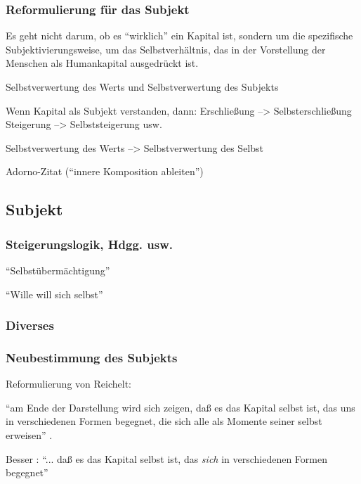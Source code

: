 \documentclass[12pt,
               DIV13,
               paper=a4,
               twoside=false,
               onehalfspacing,
               bibliography=totoc,
               toc=graduated,
               draft,
               ]{scrartcl}
\newcommand{\pc}[2]{\parencite[#1]{#2}}
\newcommand{\worries}[1]{\ifdraft{\textcolor{blue}{\texttt{(#1)}}}{}}
\begin{document}
\subsubsection{Reformulierung für das Subjekt}

Es geht nicht darum, ob es "`wirklich"' ein Kapital ist, sondern um
die spezifische Subjektivierungsweise, um das Selbstverhältnis, das in
der Vorstellung der Menschen als Humankapital ausgedrückt ist.

Selbstverwertung des Werts und Selbstverwertung des Subjekts

Wenn Kapital als Subjekt verstanden, dann:
Erschließung --> Selbsterschließung
Steigerung --> Selbststeigerung usw.

Selbstverwertung des Werts --> Selbstverwertung des Selbst

Adorno-Zitat ("`innere Komposition ableiten"')


\subsection{Subjekt}

\subsubsection{Steigerungslogik, Hdgg. usw.}

"`Selbstübermächtigung"'

"`Wille will sich selbst"'

\subsubsection{Diverses}

\subsubsection{Neubestimmung des Subjekts}

Reformulierung von Reichelt:

"`am Ende der Darstellung wird sich zeigen, daß es das Kapital selbst
ist, das uns in verschiedenen Formen begegnet, die sich alle als
Momente seiner selbst erweisen"' \pc{181}{reichelt}.

Besser \worries{?}: "`... daß es das Kapital selbst ist, das
\emph{sich} in verschiedenen Formen begegnet"'


\end{document}
